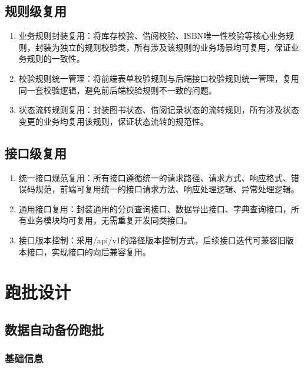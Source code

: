 \documentclass[12pt, a4paper]{article}
\begin{document}
\subsection{规则级复用}

\begin{enumerate}
\item  业务规则封装复用：将库存校验、借阅校验、ISBN唯一性校验等核心业务规则，封装为独立的规则校验类，所有涉及该规则的业务场景均可复用，保证业务规则的一致性。

\item  校验规则统一管理：将前端表单校验规则与后端接口校验规则统一管理，复用同一套校验逻辑，避免前后端校验规则不一致的问题。

\item  状态流转规则复用：封装图书状态、借阅记录状态的流转规则，所有涉及状态变更的业务均复用该规则，保证状态流转的规范性。
\end{enumerate}

\subsection{接口级复用}

\begin{enumerate}
\item  统一接口规范复用：所有接口遵循统一的请求路径、请求方式、响应格式、错误码规范，前端可复用统一的接口请求方法、响应处理逻辑、异常处理逻辑。

\item  通用接口复用：封装通用的分页查询接口、数据导出接口、字典查询接口，所有业务模块均可复用，无需重复开发同类接口。

\item  接口版本控制：采用/api/v1的路径版本控制方式，后续接口迭代可兼容旧版本接口，实现接口的向后兼容复用。
\end{enumerate}

\newpage
\section{跑批设计}

\subsection{数据自动备份跑批}

\subsubsection{基础信息}
\end{document}
